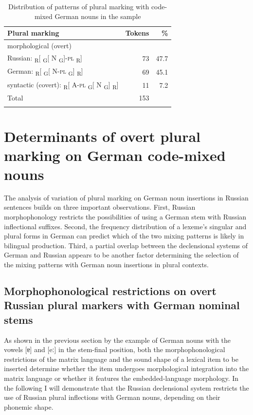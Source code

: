 \begin{table}
\begin{tabular}{l rr}
    \lsptoprule
	Plural marking & Tokens & \% \\\midrule
	morphological (overt) & & \\
	\hspace{10mm} Russian: {\textsubscript{R}[  \textsubscript{G}[ N \textsubscript{G}]-\textsc{pl} \textsubscript{R}]} & 73 & 47.7\\
	\hspace{10mm} German: {\textsubscript{R}[ \textsubscript{G}[ N-\textsc{pl} \textsubscript{G}] \textsubscript{R}]} & 69 & 45.1\\
	syntactic (covert): {\textsubscript{R}[ A-\textsc{pl} \textsubscript{G}[ N \textsubscript{G}] \textsubscript{R}]} & 11 & 7.2\\ 				
	Total & 153 & \\ 
    \lspbottomrule
	\end{tabular}
	\caption{Distribution of patterns of plural marking with code-mixed German nouns in the sample}
\label{tab:6:3}
\end{table}

\section{Determinants of overt plural marking on German code-mixed nouns}\label{sec:morphophonology}

The analysis of variation of plural marking on German noun insertions in Russian sentences builds on three important observations. First, Russian morphophonology restricts the possibilities of using a German stem with Russian inflectional suffixes. Second, the frequency distribution of a lexeme’s singular and plural forms in German can predict which of the two mixing patterns is likely in bilingual production. Third, a partial overlap between the declensional systems of German and Russian appears to be another factor determining the selection of the mixing patterns with German noun insertions in plural contexts.

\subsection{Morphophonological restrictions on overt Russian plural markers with German nominal stems}\label{sec:morph-restr}

As shown in the previous section by the example of German nouns with the vowels [ɐ] and [eː] in the stem-final position, both the morphophonological restrictions of the matrix language and the sound shape of a lexical item to be inserted determine whether the item undergoes morphological integration into the matrix language or whether it features the embedded-language morphology. In the following I will demonstrate that the Russian declensional system restricts the use of Russian plural inflections with German nouns, depending on their phonemic shape.


